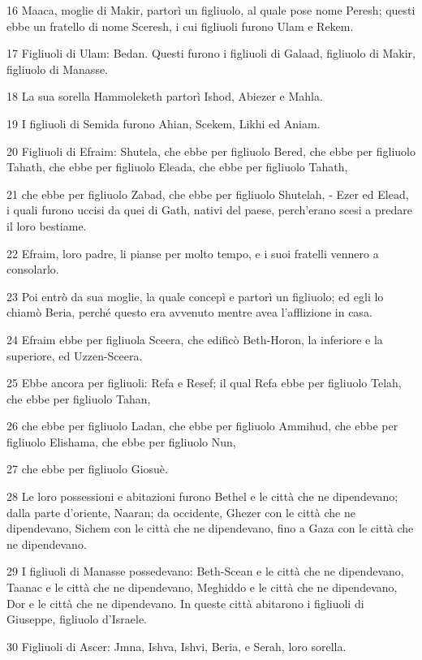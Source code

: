 \par 16 Maaca, moglie di Makir, partorì un figliuolo, al quale pose nome Peresh; questi ebbe un fratello di nome Sceresh, i cui figliuoli furono Ulam e Rekem.
\par 17 Figliuoli di Ulam: Bedan. Questi furono i figliuoli di Galaad, figliuolo di Makir, figliuolo di Manasse.
\par 18 La sua sorella Hammoleketh partorì Ishod, Abiezer e Mahla.
\par 19 I figliuoli di Semida furono Ahian, Scekem, Likhi ed Aniam.
\par 20 Figliuoli di Efraim: Shutela, che ebbe per figliuolo Bered, che ebbe per figliuolo Tahath, che ebbe per figliuolo Eleada, che ebbe per figliuolo Tahath,
\par 21 che ebbe per figliuolo Zabad, che ebbe per figliuolo Shutelah, - Ezer ed Elead, i quali furono uccisi da quei di Gath, nativi del paese, perch'erano scesi a predare il loro bestiame.
\par 22 Efraim, loro padre, li pianse per molto tempo, e i suoi fratelli vennero a consolarlo.
\par 23 Poi entrò da sua moglie, la quale concepì e partorì un figliuolo; ed egli lo chiamò Beria, perché questo era avvenuto mentre avea l'afflizione in casa.
\par 24 Efraim ebbe per figliuola Sceera, che edificò Beth-Horon, la inferiore e la superiore, ed Uzzen-Sceera.
\par 25 Ebbe ancora per figliuoli: Refa e Resef; il qual Refa ebbe per figliuolo Telah, che ebbe per figliuolo Tahan,
\par 26 che ebbe per figliuolo Ladan, che ebbe per figliuolo Ammihud, che ebbe per figliuolo Elishama, che ebbe per figliuolo Nun,
\par 27 che ebbe per figliuolo Giosuè.
\par 28 Le loro possessioni e abitazioni furono Bethel e le città che ne dipendevano; dalla parte d'oriente, Naaran; da occidente, Ghezer con le città che ne dipendevano, Sichem con le città che ne dipendevano, fino a Gaza con le città che ne dipendevano.
\par 29 I figliuoli di Manasse possedevano: Beth-Scean e le città che ne dipendevano, Taanac e le città che ne dipendevano, Meghiddo e le città che ne dipendevano, Dor e le città che ne dipendevano. In queste città abitarono i figliuoli di Giuseppe, figliuolo d'Israele.
\par 30 Figliuoli di Ascer: Jmna, Ishva, Ishvi, Beria, e Serah, loro sorella.
